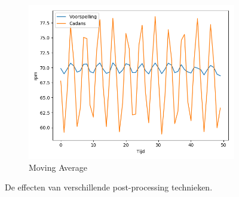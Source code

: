 \begin{figure}[!t]
\begin{subfigure}{.5\textwidth}
  \includegraphics[width=\linewidth]{images/actual-prediction+noice,ma.png}
  \caption{Moving Average}
  \label{fig:moving average postprocessing}
\end{subfigure}
\caption{De effecten van verschillende post-processing technieken.}
\label{fig:effecten postprocessing}
\end{figure}
\newpage
